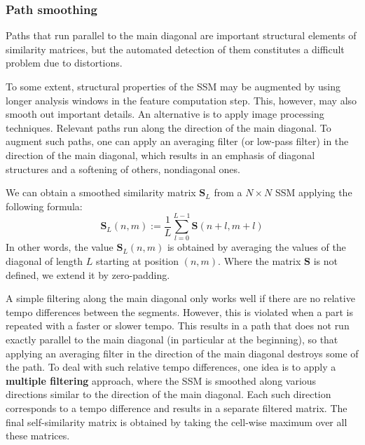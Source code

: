 \documentclass[a4paper, 9pt, twocolumn]{extarticle}
\begin{document}
\subsubsection{Path smoothing}
\label{subsubsection:ssmEnhancementPathSmoothing}


Paths that run parallel to the main diagonal are important structural elements of similarity matrices, but the automated detection of them constitutes a difficult problem due to distortions. 

To some extent, structural properties of the SSM may be augmented by using longer analysis windows in the feature computation step. This, however, may also smooth out important details. An alternative is to apply image processing techniques. Relevant paths run along the direction of the main diagonal. To augment such paths, one can apply an averaging filter (or low-pass filter) in the direction of the main diagonal, which results in an emphasis of diagonal structures and a softening of others, nondiagonal ones.

We can obtain a smoothed similarity matrix $\textbf{S}_{L}$ from a $N \times N$  SSM applying the following formula: 
\[\textbf{S}_{L}(n,m):= \frac{1}{L}\sum_{l=0}^{L-1}\textbf{S}(n+l,m+l)\]
In other words, the value $\textbf{S}_{L}(n,m)$ is obtained by averaging the values of the diagonal of length $L$ starting at position $(n,m)$. Where the matrix $\textbf{S}$ is not defined, we extend it by zero-padding. 

A simple filtering along the main diagonal only works well if there are no relative tempo differences between the segments. However, this is violated when a part is repeated with a faster or slower tempo. This results in a path that does not run exactly parallel to the main diagonal (in particular at the beginning), so that applying an averaging filter in the direction of the main diagonal destroys some of the path. To deal with such relative tempo differences, one idea is to apply a \textbf{multiple filtering} approach, where the SSM is smoothed along various directions similar to the direction of the main diagonal. Each such direction corresponds to a tempo difference and results in a separate filtered matrix. The final self-similarity matrix is obtained by taking the cell-wise maximum over all these matrices.  
\end{document}
